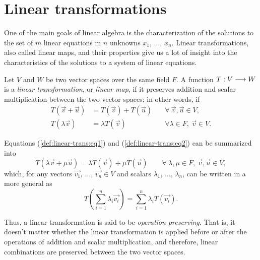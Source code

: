 \chapter{Linear transformations}
\thispagestyle{noheaders}

One of the main goals of linear algebra is the characterization of the solutions to the set of $m$
linear equations in $n$ unknowns $x_1$, $\ldots$, $x_n$. Linear transformations, also called linear maps,
and their properties give us a lot of insight into the characteristics of the solutions to a system of
linear equations.


\begin{defi}
    Let $V$ and $W$ be two vector spaces over the same field $F$. A function $T : V\longrightarrow W$ is a
    \textit{linear transformation}, or \textit{linear map}, if it preserves addition and scalar multiplication
    between the two vector spaces; in other words, if
    \begin{align}\label{def:linear-trans:eq1}
        T\left( \vec{v} + \vec{u} \right) &= T\left( \vec{v} \right) + T\left( \vec{u} \right) \quad
                                          &\forall\ \vec{v}, \vec{u}\in V, \\
        T\left( \lambda\vec{v} \right) &= \lambda T\left( \vec{v} \right) \quad &\forall \lambda\in
        F,\ \vec{v}\in V. \label{def:linear-trans:eq2}
    \end{align}
\end{defi}

\noindent Equations (\ref{def:linear-trans:eq1}) and (\ref{def:linear-trans:eq2}) can be summarized into
\begin{equation}
    T\left( \lambda\vec{v} + \mu\vec{u} \right) = \lambda T\left( \vec{v} \right) + \mu T\left( \vec{u}\right)
    \quad\quad \forall\ \lambda, \mu\in F,\ \vec{v}, \vec{u}\in V,
\end{equation}
which, for any vectors $\vec{v_1}$, $\ldots$, $\vec{v_n}\in V$ and scalars $\lambda_1$, $\ldots$, $\lambda_n$, can be written in a more general as
\begin{equation}
    T\left( \sum_{i=1}^n \lambda_i\vec{v_i}\right) = \sum_{i=1}^n \lambda_i T\left( \vec{v_i} \right).
\end{equation}

\noindent Thus, a linear transformation is said to be \textit{operation preserving}. That is, it doesn't matter
whether the linear transformation is applied before or after the operations of addition and scalar
multiplication, and therefore, linear combinations are preserved between the two vector spaces.

